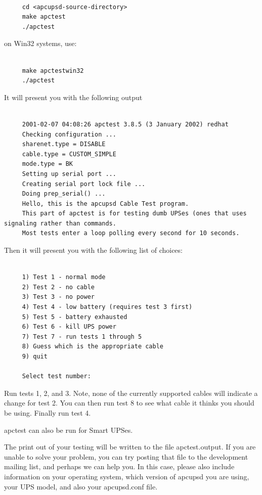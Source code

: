 {{{{{{{{{{\footnotesize
\begin{verbatim}
     
     cd <apcupsd-source-directory>
     make apctest
     ./apctest
\end{verbatim}
\normalsize

on Win32 systems, use: 

\footnotesize
\begin{verbatim}
     
     make apctestwin32
     ./apctest
\end{verbatim}
\normalsize

It will present you with the following output 

\footnotesize
\begin{verbatim}
     
     2001-02-07 04:08:26 apctest 3.8.5 (3 January 2002) redhat
     Checking configuration ...
     sharenet.type = DISABLE
     cable.type = CUSTOM_SIMPLE
     mode.type = BK
     Setting up serial port ...
     Creating serial port lock file ...
     Doing prep_serial() ...
     Hello, this is the apcupsd Cable Test program.
     This part of apctest is for testing dumb UPSes (ones that uses signaling rather than commands.
     Most tests enter a loop polling every second for 10 seconds.
\end{verbatim}
\normalsize

Then it will present you with the following list of choices: 

\footnotesize
\begin{verbatim}
     
     1) Test 1 - normal mode
     2) Test 2 - no cable
     3) Test 3 - no power
     4) Test 4 - low battery (requires test 3 first)
     5) Test 5 - battery exhausted
     6) Test 6 - kill UPS power
     7) Test 7 - run tests 1 through 5
     8) Guess which is the appropriate cable
     9) quit
     
     Select test number:
\end{verbatim}
\normalsize

Run tests 1, 2, and 3. Note, none of the currently supported cables will
indicate a change for test 2. You can then run test 8 to see what cable it
thinks you should be using. Finally run test 4.  

apctest can also be run for Smart UPSes.  

The print out of your testing will be written to the file apctest.output. If
you are unable to solve your problem, you can try posting that file to the
development mailing list, and perhaps we can help you. In this case, please
also include information on your operating system, which version of apcupsd
you are using, your UPS model, and also your apcupsd.conf file. 

}}}}}}}}}}
